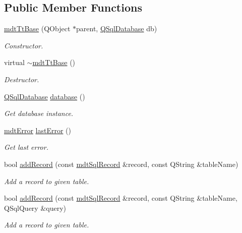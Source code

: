 \subsection*{Public Member Functions}
\begin{DoxyCompactItemize}
\item 
\hyperlink{classmdt_tt_base_a6dbd221d1518e30c3692a7ba54b57c03}{mdt\-Tt\-Base} (Q\-Object $\ast$parent, \hyperlink{class_q_sql_database}{Q\-Sql\-Database} db)
\begin{DoxyCompactList}\small\item\em Constructor. \end{DoxyCompactList}\item 
virtual \hyperlink{classmdt_tt_base_ab5081719f8d49a8d6547240c5cc01699}{$\sim$mdt\-Tt\-Base} ()
\begin{DoxyCompactList}\small\item\em Destructor. \end{DoxyCompactList}\item 
\hyperlink{class_q_sql_database}{Q\-Sql\-Database} \hyperlink{classmdt_tt_base_a82c3f795b6cb8101b12e0e0ef340c1be}{database} ()
\begin{DoxyCompactList}\small\item\em Get database instance. \end{DoxyCompactList}\item 
\hyperlink{classmdt_error}{mdt\-Error} \hyperlink{classmdt_tt_base_a92adaae105cef63b18ace2e320776ca9}{last\-Error} ()
\begin{DoxyCompactList}\small\item\em Get last error. \end{DoxyCompactList}\item 
bool \hyperlink{classmdt_tt_base_a4ca4fb3600aad6a8f279abd37fc1a4d7}{add\-Record} (const \hyperlink{classmdt_sql_record}{mdt\-Sql\-Record} \&record, const Q\-String \&table\-Name)
\begin{DoxyCompactList}\small\item\em Add a record to given table. \end{DoxyCompactList}\item 
bool \hyperlink{classmdt_tt_base_a1dc2f8748c7b1b86569868ac9a092b2d}{add\-Record} (const \hyperlink{classmdt_sql_record}{mdt\-Sql\-Record} \&record, const Q\-String \&table\-Name, Q\-Sql\-Query \&query)
\begin{DoxyCompactList}\small\item\em Add a record to given table. \end{DoxyCompactList}\item 

\end{DoxyCompactItemize}
